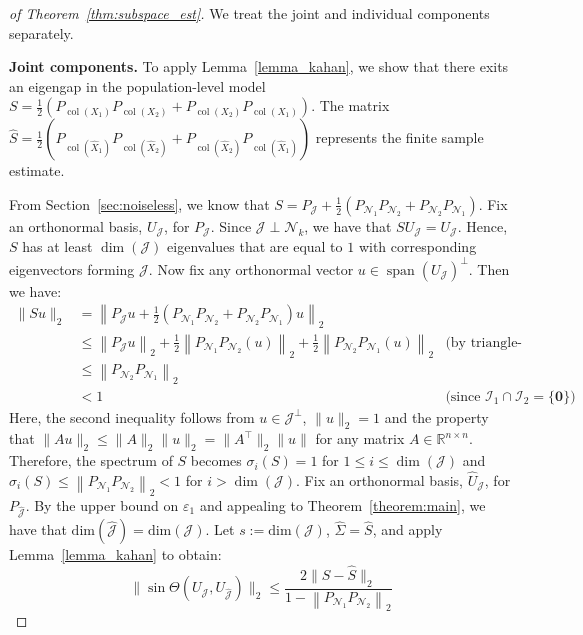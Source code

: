 \documentclass{amsart}
\DeclareMathOperator*{\col}{col}
\DeclareMathOperator*{\spann}{span}
\newcommand{\Ncal}{\mathcal{N}}
\newcommand{\Jcal}{\mathcal{J}}
\newcommand{\Ical}{\mathcal{I}}
\begin{document}
\begin{proof}[of Theorem~\ref{thm:subspace_est}] We treat the joint and individual components separately. 

    \noindent
    \textbf{Joint components.}
    To apply Lemma~\ref{lemma_kahan}, we show that there exits an eigengap in the population-level model $S = \tfrac{1}{2}\left(P_{\col(X_1)} P_{\col(X_2)} + P_{\col(X_2)}P_{\col(X_1)}  \right)$. The matrix $\widehat{S} = \tfrac{1}{2}\left(P_{{\col}(\widehat{X}_1)} P_{{\col}(\widehat{X}_2)} + P_{{\col}(\widehat{X}_2)}P_{{\col}(\widehat{X}_1)}  \right)$ represents the finite sample estimate. 
    
    From Section~\ref{sec:noiseless}, we know that $S = P_{\Jcal} + \frac{1}{2}\left(P_{\Ncal_1}P_{\Ncal_2}+P_{\Ncal_2}P_{\Ncal_1}\right)$. Fix an orthonormal basis, $U_{\Jcal}$, for $P_{\Jcal}$. Since $\Jcal \perp \Ncal_k$, we have that $SU_{\Jcal} = U_{\Jcal}$. Hence, $S$ has at least $\dim (\Jcal)$ eigenvalues that are equal to $1$ with corresponding eigenvectors forming $\Jcal$. Now fix any orthonormal vector $u \in \spann (U_{\Jcal})^\perp$. Then we have:
    \begin{align*}
        \|Su\|_2 &= \left\|P_{\Jcal} u + \tfrac{1}{2}\left(P_{\Ncal_1}P_{\Ncal_2}+P_{\Ncal_2}P_{\Ncal_1}\right) u\right\|_2 \\
        &\leq {\left\|P_{\Jcal} u\right\|_2 +\frac{1}{2}\left\|P_{\Ncal_1}P_{\Ncal_2}(u)\right\|_2 +\frac{1}{2}\left\|P_{\Ncal_2}P_{\Ncal_1}(u)\right\|_2} & \text{(by triangle-inequality)} \\
        &\leq \left\|P_{\Ncal_2}P_{\Ncal_1}\right\|_2 \\
        &< 1 & \text{(since }\Ical_1 \cap \Ical_2 = \{\mathbf{0}\})
    \end{align*}
    {Here, the second inequality follows from $u \in \Jcal^\perp$, $\|u\|_2=1$ and the property that $\|Au\|_2 \leq \|A\|_2\|u\|_2=\|A^\top\|_2\|u\|$ for any matrix $A\in\mathbb{R}^{n \times n}$}. Therefore, the spectrum of $S$ becomes $\sigma_i(S) = 1$ for $1 \leq i \leq \dim(\Jcal)$ and $\sigma_i(S) \leq \left\|P_{\Ncal_1} P_{\Ncal_2}\right\|_2 < 1$ for $i > \dim (\Jcal)$. Fix an orthonormal basis, $\widehat{U}_{\Jcal}$, for $P_{\widehat{\Jcal}}$. By the upper bound on $\varepsilon_1$ and appealing to Theorem~\ref{theorem:main}, we have that $\mathrm{dim}(\widehat{\Jcal}) = \mathrm{dim}(\Jcal)$. Let $s :=  \mathrm{dim}(\Jcal)$, $\widehat{\Sigma} = \widehat{S}$, and apply Lemma~\ref{lemma_kahan} to obtain:
    \begin{equation*}
        \| \sin\Theta(U_{\Jcal}, U_{\widehat{\Jcal}}) \|_2 \leq \frac{{2} \| S -\widehat{S} \|_2}{1-\left\|P_{\Ncal_1} P_{\Ncal_2}\right\|_2}

\end{equation*}
\end{proof}
\end{document}
